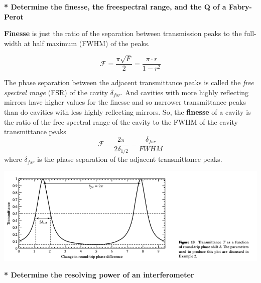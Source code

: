 \documentclass[10pt]{article}
\newcommand*{\lo}[1]{
    \textbf{* #1} \newline
}
\begin{document}
\newpage

\lo{Determine the finesse, the freespectral range, and the Q of a Fabry-Perot}

\textbf{Finesse} is just the ratio of the separation between transmission peaks to the full-width at half maximum (FWHM) of the peaks.

\[\mathcal{F} = \frac{\pi\sqrt{F}}{2} = \frac{\pi \cdot r}{1 - r^2}\]

The phase separation between the adjacent transmittance peaks is called the \textit{free spectral range} (FSR) of the cavity $\delta_{fsr}$. And cavities with more highly reflecting mirrors have higher values for the finesse and so narrower transmittance peaks than do cavities with less highly reflecting mirrors. So, the \textbf{finesse} of a cavity is the ratio of the free spectral range of the cavity to the FWHM of the cavity transmittance peaks
\[\mathcal{F} = \frac{2\pi}{2\delta_{1/2}} = \frac{\delta_{fsr}}{FWHM}\]
where $\delta_{fsr}$ is the phase separation of the adjacent transmittance peaks.

\begin{center}
    \includegraphics*[scale = .6]{imgs/fwhm-t-diagram.png}
\end{center}

\lo{Determine the resolving power of an interferometer}
\end{document}
